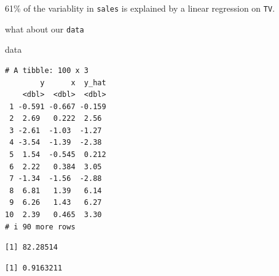 \documentclass[
  letterpaper,
  DIV=11,
  numbers=noendperiod]{scrreprt}
\newenvironment{Shaded}{\begin{snugshade}}{\end{snugshade}}
\newcommand{\DecValTok}[1]{\textcolor[rgb]{0.68,0.00,0.00}{#1}}
\newcommand{\FunctionTok}[1]{\textcolor[rgb]{0.28,0.35,0.67}{#1}}
\newcommand{\NormalTok}[1]{\textcolor[rgb]{0.00,0.23,0.31}{#1}}
\newcommand{\OtherTok}[1]{\textcolor[rgb]{0.00,0.23,0.31}{#1}}
\newcommand{\SpecialCharTok}[1]{\textcolor[rgb]{0.37,0.37,0.37}{#1}}
\begin{document}
61\% of the variablity in \texttt{sales} is explained by a linear
regression on \texttt{TV}.

what about our \texttt{data}

\begin{Shaded}
\begin{Highlighting}[]
\NormalTok{data}
\end{Highlighting}
\end{Shaded}

\begin{verbatim}
# A tibble: 100 x 3
        y      x  y_hat
    <dbl>  <dbl>  <dbl>
 1 -0.591 -0.667 -0.159
 2  2.69   0.222  2.56 
 3 -2.61  -1.03  -1.27 
 4 -3.54  -1.39  -2.38 
 5  1.54  -0.545  0.212
 6  2.22   0.384  3.05 
 7 -1.34  -1.56  -2.88 
 8  6.81   1.39   6.14 
 9  6.26   1.43   6.27 
10  2.39   0.465  3.30 
# i 90 more rows
\end{verbatim}

\begin{Shaded}
\end{Shaded}

\begin{verbatim}
[1] 82.28514
\end{verbatim}

\begin{Shaded}
\end{Shaded}

\begin{verbatim}
[1] 0.9163211
\end{verbatim}

\begin{Shaded}
\end{Shaded}
\end{document}
